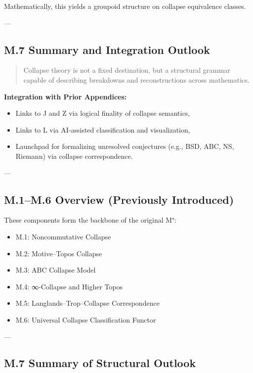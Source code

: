 \documentclass[11pt]{article}
\begin{document}
\begin{axiom}
\begin{axiom}
{{Mathematically, this yields a groupoid structure on collapse equivalence classes.

---

\subsection*{M.7 Summary and Integration Outlook}

\begin{quote}
Collapse theory is not a fixed destination, but a structural grammar  
capable of describing breakdowns and reconstructions across mathematics.
\end{quote}

\textbf{Integration with Prior Appendices:}
\begin{itemize}
  \item Links to J and Z via logical finality of collapse semantics,
  \item Links to L via AI-assisted classification and visualization,
  \item Launchpad for formalizing unresolved conjectures (e.g., BSD, ABC, NS, Riemann) via collapse correspondence.
\end{itemize}

---

\subsection*{M.1–M.6 Overview (Previously Introduced)}

These components form the backbone of the original M⁺:

\begin{itemize}
  \item M.1: Noncommutative Collapse
  \item M.2: Motive–Topos Collapse
  \item M.3: ABC Collapse Model
  \item M.4: ∞-Collapse and Higher Topos
  \item M.5: Langlands–Trop–Collapse Correspondence
  \item M.6: Universal Collapse Classification Functor
\end{itemize}

---

\subsection*{M.7 Summary of Structural Outlook}

}}
\end{axiom}
\end{axiom}
\end{document}
